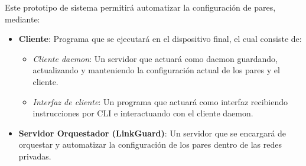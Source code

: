 Este prototipo de sistema permitirá automatizar la configuración de pares, mediante:
\begin{itemize}
    \item \textbf{Cliente}: Programa que se ejecutará en el dispositivo final, el cual consiste de:
    \begin{itemize}
        \item \textit{Cliente daemon}: Un servidor que actuará como daemon guardando, actualizando y manteniendo la configuración actual de los pares y el cliente.
        \item \textit{Interfaz de cliente}: Un programa que actuará como interfaz recibiendo instrucciones por CLI e interactuando con el cliente daemon.
    \end{itemize}
    \item \textbf{Servidor Orquestador (LinkGuard)}: Un servidor que se encargará de orquestar y automatizar la configuración de los pares dentro de las redes privadas.
\end{itemize}
